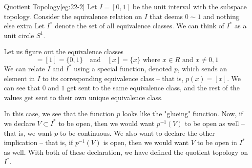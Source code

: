 \begin{egBox}{Quotient Topology}[eg:22-2]
    Let \( I = [ 0, 1 ] \) be the unit interval with the subspace topology.
    Consider the equivalence relation on \( I \) that deems \( 0 \sim 1 \) and
    nothing else extra
    Let \( I^{ * } \) denote the set of all equivalence classes.
    We can think of \( I^{ * } \) as a unit circle \( S^{ 1 } \).

    \baseSkip

    Let us figure out the equivalence classes
    \begin{equation*}
        [ 0 ] = [ 1 ] = \{ 0, 1 \}
        \quad \mathrm{and} \quad 
        [ x ] = \{ x \}
        \text{ where } x \in R \text{ and } x \neq 0, 1
    \end{equation*}
    We can relate \( I \) and \( I^{ * } \) using a special function, denoted 
    \( p \), which sends an element in \( I \) to its corresponding equivalence
    class -- that is, \( p ( x ) = [ x ] \).
    We can see that \( 0 \) and \( 1 \) get sent to the same equivalence class,
    and the rest of the values get sent to their own unique equivalence class.

    \baseSkip 

    In this case, we see that the function \( p \) looks like the "glueing" 
    function.
    Now, if we declare \( V \subset I^{ * } \) to be open, then we would want 
    \( p^{ -1 } ( V ) \) to be open as well -- that is, we want \( p \) to be
    continuous.
    We also want to declare the other implication -- that is, if
    \( p^{ -1 } ( V ) \) is open, then we would want \( V \) to be open in 
    \( I^{ * } \) as well.
    With both of these declaration, we have defined the quotient topology on 
    \( I^{ * } \).
\end{egBox}

